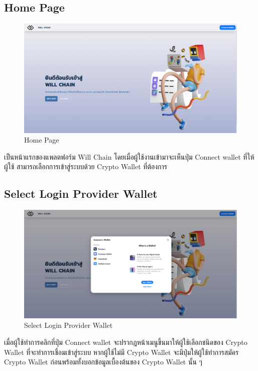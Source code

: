 \documentclass[12pt,oneside,openright,a4paper]{cpe-thai-project}
\begin{document}
\subsection{Home Page}
	\begin{figure}[!thb]
			\centering
			\includegraphics[scale=0.2]{homePageBefore4}
			\caption{Home Page}
		\end{figure}
		\FloatBarrier
\tab เป็นหน้าแรกของแพลตฟอร์ม Will Chain โดยเมื่อผู้ใช้งานเข้ามาจะเห็นปุ่ม Connect wallet ที่ให้ผู้ใช้ สามารถเลือกการเข้าสู่ระบบด้วย Crypto Wallet ที่ต้องการ 
\subsection{Select Login Provider Wallet}
	\begin{figure}[!thb]
			\centering
			\includegraphics[scale=0.2]{homePageSelect4}
			\caption{Select Login Provider Wallet}
		\end{figure}
		\FloatBarrier
\tab เมื่อผู้ใช้ทำการคลิกที่ปุ่ม Connect wallet จะปรากฎหน้าเมนูขึ้นมาให้ผู้ใช้เลือกชนิดของ Crypto Wallet ที่จะทำการเชื่อมเข้าสู่ระบบ หากผู้ใช้ไม่มี Crypto Wallet จะมีปุ่มให้ผู้ใช้ทำการสมัคร Crypto Wallet ก่อนพร้อมทั้งบอกข้อมูลเบื้องต้นของ Crypto Wallet นั้น ๆ 
\end{document}
